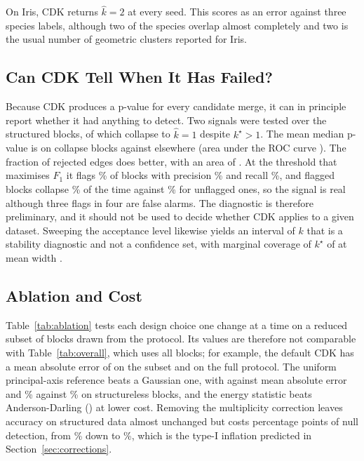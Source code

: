 \documentclass[runningheads]{llncs}
\begin{document}
On Iris, CDK returns $\hat k = 2$ at every seed. This scores as an error
against three species labels, although two of the species overlap almost
completely and two is the usual number of geometric clusters reported for
Iris.

\subsection{Can CDK Tell When It Has Failed?}
\label{sec:diag}



Because CDK produces a p-value for every candidate merge, it can in principle
report whether it had anything to detect. Two signals were tested over the
\nNSTRUCTCDK{} structured blocks, of which \nNCOLLAPSE{} collapse to
$\hat k = 1$ despite $k^\star > 1$. The mean median p-value is \nPMEDCOL{} on
collapse blocks against \nPMEDOK{} elsewhere (area under the ROC curve
\nAUCPMED{}). The fraction of rejected edges does better, with an area of
\nAUCSEP{}. At the threshold that maximises $F_1$ it flags \nSEPFLAGPCT\% of
blocks with precision \nSEPPREC\% and recall \nSEPREC\%, and flagged blocks
collapse \nSEPCOLFLAG\% of the time against \nSEPCOLUNFLAG\% for unflagged
ones, so the signal is real although three flags in four are false alarms.
The diagnostic is therefore preliminary, and it should not be used to decide
whether CDK applies to a given dataset. Sweeping the acceptance level likewise
yields an interval of $k$ that is a stability diagnostic and not a confidence
set, with marginal coverage of $k^\star$ of \nCOV{} at mean width \nCOVW{}.

\subsection{Ablation and Cost}
\label{sec:abl}

Table~\ref{tab:ablation} tests each design choice one change at a time on a
reduced subset of \nNABLB{} blocks drawn from the protocol. Its values are
therefore not comparable with Table~\ref{tab:overall}, which uses all
\nNBLOCK{} blocks; for example, the default CDK has a mean absolute error of
\nCDKMAEabl{} on the subset and \nCDKMAE{} on the full protocol. The uniform principal-axis reference beats a Gaussian one,
with \nCDKMAEabl{} against \nABLGaussiannullMAE{} mean absolute error and
\nCDKNULLabl\% against \nABLGaussiannullNULL\% on structureless blocks, and
the energy statistic beats Anderson-Darling (\nABLADstatisticMAE{}) at lower
cost. Removing the multiplicity correction leaves accuracy on structured data
almost unchanged but costs \nMULTDROP{} percentage points of null detection,
from \nCDKNULLabl\% down to \nABLnomultiplicitycorrNULL\%, which is the type-I
inflation predicted in Section~\ref{sec:corrections}.
\end{document}
